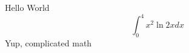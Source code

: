 \documentclass{article}
\begin{document}
Hello World
$$\int_0^4 x^2 \ln{2x}dx$$
Yup, complicated math
\end{document}
